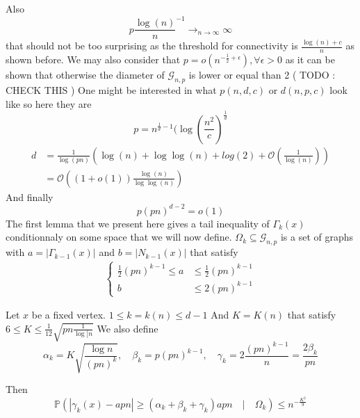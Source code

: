 Also 
\begin{equation}
	p \frac{\log(n)}{n}^{-1} \longrightarrow_{n \to \infty} \infty
\end{equation}
that should not be too surprising as the threshold for connectivity is $\frac{\log(n) + c}{n}$ as shown before.
We may also consider that $p = o(n^{-\frac{1}{2} +\epsilon}), \forall \epsilon > 0$ as it can be shown that otherwise the diameter of $\mathcal{G}_{n,p}$ is lower or equal than 2 ( TODO : CHECK THIS )
One might be interested in what $p(n, d, c)$ or $d(n , p, c)$ look like so here they are
\begin{equation}
	p=n^{\frac{1}{d} - 1}(\log(\frac{n^2}{c})^\frac{1}{d}
\end{equation}
\begin{align}
	d &= \frac{1}{\log(pn)}(\log(n) + \log \log (n) + log(2) + \mathcal{O}(\frac{1}{\log(n)}))\\
	  &= \mathcal{O}((1+o(1))\frac{\log(n)}{\log\log(n)})
\end{align}
And finally
\begin{equation}
	p(pn)^{d-2} = o(1)
\end{equation}
The first lemma that we present here gives a tail inequality of $\Gamma_k(x)$ conditionnaly on some space that we will now define. $\Omega_k \subseteq \mathcal{G}_{n, p}$ is a set of graphs with $a = |\Gamma_{k-1}(x)|$ and $b = |N_{k-1}(x)|$ that satisfy
\begin{align}
 \left\{\begin{array}{rl}
		 \frac{1}{2}(pn)^{k-1} \leq a &\leq \frac{1}{2}(pn)^{k-1} \\
		 			    b &\leq 2(pn)^{k-1}
	 \end{array}
	\right.
\end{align}
\begin{lemma}
	Let $x$ be a fixed vertex.
	\newline
	$1 \leq k = k(n)  \leq d-1$
	\newline
	And $ K = K(n)$ that satisfy $ 6 \leq K \leq \frac{1}{12} \sqrt{pn\frac{1}{\log[n}}$
	We also define
	\begin{equation}
		\alpha_k = K\sqrt{\frac{\log{n}}{(pn)^k}} , \quad \beta_k = p(pn)^{k-1}, \quad \gamma_k = 2\frac{(pn)^{k-1}}{n} = \frac{2\beta_k}{pn}
	\end{equation}

	Then
	\begin{equation}
		\mathbb{P}(|\gamma_k(x) - apn| \geq (\alpha_k + \beta_k + \gamma_k)apn \quad|\quad \Omega_k) \leq n^{-\frac{K^2}{9}}
	\end{equation}
\end{lemma}

